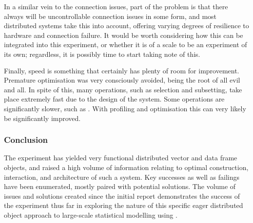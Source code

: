 In a similar vein to the connection issues, part of the problem is that
there always will be uncontrollable connection issues in some form, and
most distributed systems take this into account, offering varying
degrees of resilience to hardware and connection failure. It would be
worth considering how this can be integrated into this experiment, or
whether it is of a scale to be an experiment of its own; regardless, it
is possibly time to start taking note of this.

Finally, speed is something that certainly has plenty of room for
improvement. Premature optimisation was very consciously avoided, being
the root of all evil and all. In spite of this, many operations, such as
selection and subsetting, take place extremely fast due to the design of
the system. Some operations are significantly slower, such as
. With profiling and optimisation this
can very likely be significantly improved.

\subsubsection{Conclusion}\label{conclusion}

The experiment has yielded very functional distributed vector and data
frame objects, and raised a high volume of information relating to
optimal construction, interaction, and architecture of such a system.
Key successes as well as failings have been enumerated, mostly paired
with potential solutions. The volume of issues and solutions created
since the initial report demonstrates the success of the experiment thus
far in exploring the nature of this specific eager distributed object
approach to large-scale statistical modelling using \R{}.
